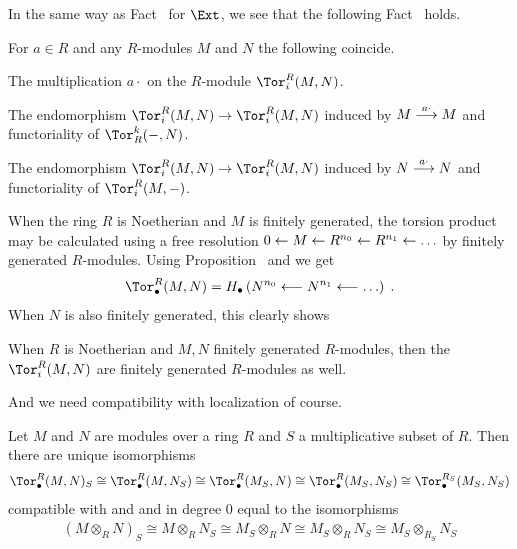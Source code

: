 \documentclass[a4paper,parskip=half,numbers=enddot, DIV=12]{scrreprt}
\begin{document}
In the same way as Fact~ for $\Ext$, we see that the following Fact~ holds.
\begin{fact}
	For $a\in R$ and any $R$-modules $M$ and $N$ the following coincide.
	\begin{alphanumerate}
		\item The multiplication $a\cdot $ on the $R$-module $\Tor_i^R(M,N)$.
		\item The endomorphism $\Tor_i^R(M,N)\morphism\Tor_i^R(M,N)$ induced by $M\morphism[a\cdot ]M$ and functoriality of $\Tor_R^k(-,N)$.
		\item The endomorphism $\Tor_i^R(M,N)\morphism\Tor_i^R(M,N)$ induced by $N\morphism[a\cdot ]N$ and functoriality of $\Tor_i^R(M,-)$.
	\end{alphanumerate}
\end{fact}
When the ring $R$ is Noetherian and $M$ is finitely generated, the torsion product may be calculated using a free resolution $0\lmorphism M\lmorphism R^{n_0}\lmorphism R^{n_1}\lmorphism\ldots$ by finitely generated $R$-modules. Using Proposition~ and  we get
\begin{align*}
	\Tor_\bullet^R(M,N)=H_\bullet\left(N^{n_0}\lmorphism N^{n_1}\lmorphism\ldots\right)\;.
\end{align*}
When $N$ is also finitely generated, this clearly shows
\begin{fact}
	When $R$ is Noetherian  and $M,N$ finitely generated $R$-modules, then the $\Tor_i^R(M,N)$ are finitely generated $R$-modules as well.
\end{fact}
And we need compatibility with localization of course.
\begin{fact}
	Let $M$ and $N$ are modules over a ring $R$ and $S$ a multiplicative subset of $R$. Then there are unique isomorphisms
	\begin{align*}
		\Tor_\bullet^R(M,N)_S\cong \Tor_\bullet^R(M,N_S)\cong \Tor_\bullet^R(M_S,N)\cong \Tor_\bullet^R(M_S,N_S)\cong \Tor_\bullet^{R_S}(M_S,N_S)
	\end{align*}
	compatible with  and  and in degree $0$ equal to the isomorphisms
	\begin{align*}
		(M\otimes _RN)_S\cong M\otimes _RN_S\cong M_S\otimes _RN\cong M_S\otimes _RN_S\cong {M_S}\otimes _{R_S}N_S
	\end{align*}
\end{fact}
\end{document}
